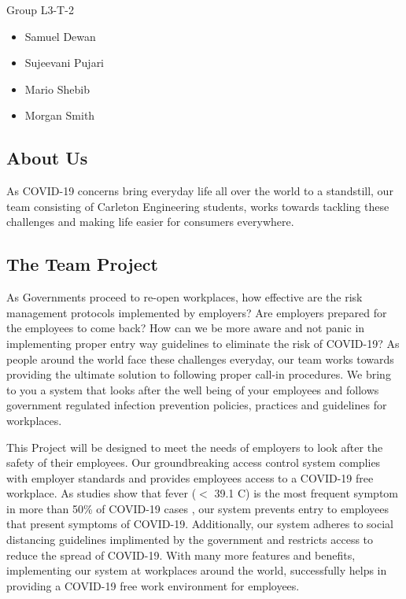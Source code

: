 Group L3-T-2
\begin{itemize}
    \item Samuel Dewan
    \item Sujeevani Pujari 
    \item Mario Shebib 
    \item Morgan Smith
\end{itemize}

\subsection{About Us}

As COVID-19 concerns bring everyday life all over the world to a standstill, our
team consisting of Carleton Engineering students, works towards tackling these
challenges and making life easier for consumers everywhere.

\subsection{The Team Project} 

As Governments proceed to re-open workplaces, how effective are the risk
management protocols implemented by employers? Are employers prepared for the
employees to come back? How can we be more aware and not panic in implementing
proper entry way guidelines to eliminate the risk of COVID-19? As people
around the world face these challenges everyday, our team works towards
providing the ultimate solution to following proper call-in procedures. We bring
to you a system that looks after the well being of your employees and follows
government regulated infection prevention policies, practices and guidelines for
workplaces. 

This Project will be designed to meet the needs of employers to look after the
safety of their employees. Our groundbreaking access control system complies
with employer standards and provides employees access to a COVID-19 free
workplace. As studies show that fever ($<$ 39.1 \textdegree C) is the most frequent symptom
in more than 50\% of COVID-19 cases \cite{Michelen_2020}, our system prevents
entry to employees that present symptoms of COVID-19. Additionally, our system
adheres to social distancing guidelines implimented by the government and
restricts access to reduce the spread of COVID-19. With many more features and
benefits, implementing our system at workplaces around the world, successfully
helps in providing a COVID-19 free work environment for employees. 

